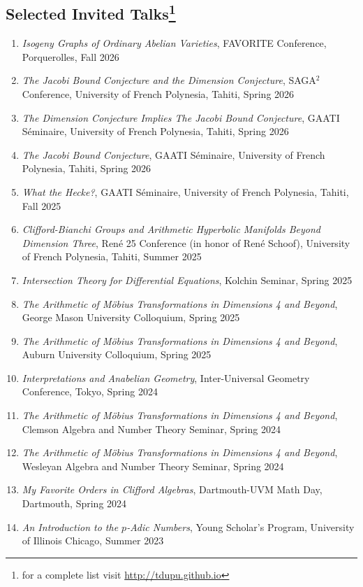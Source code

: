 \documentclass[a4paper,10pt]{article}
\begin{document}
\subsection*{Selected Invited Talks\footnote{ for a complete list visit \url{http://tdupu.github.io} }}
\begin{enumerate} %
	\item \emph{Isogeny Graphs of Ordinary Abelian Varieties}, FAVORITE Conference, Porquerolles, Fall 2026
	\item \emph{The Jacobi Bound Conjecture and the Dimension Conjecture}, SAGA$^2$ Conference, University of French Polynesia, Tahiti, Spring 2026
	\item \emph{The Dimension Conjecture Implies The Jacobi Bound Conjecture}, GAATI S\'eminaire, University of French Polynesia, Tahiti, Spring 2026
	\item \emph{The Jacobi Bound Conjecture}, GAATI S\'eminaire, University of French Polynesia, Tahiti, Spring 2026
	\item \emph{What the Hecke?}, GAATI S\'eminaire, University of French Polynesia, Tahiti, Fall 2025
	\item \emph{Clifford-Bianchi Groups and Arithmetic Hyperbolic Manifolds Beyond Dimension Three}, Ren\'e 25 Conference (in honor of Ren\'e Schoof), University of French Polynesia, Tahiti, Summer 2025
	\item \emph{Intersection Theory for Differential Equations}, Kolchin Seminar, Spring 2025
	\item \emph{The Arithmetic of M\"{o}bius Transformations in Dimensions 4 and Beyond}, George Mason University Colloquium, Spring 2025
	\item \emph{The Arithmetic of M\"{o}bius Transformations in Dimensions 4 and Beyond}, Auburn University Colloquium, Spring 2025
	\item \emph{Interpretations and Anabelian Geometry}, Inter-Universal Geometry Conference, Tokyo, Spring 2024
	\item \emph{The Arithmetic of M\"{o}bius Transformations in Dimensions 4 and Beyond}, Clemson Algebra and Number Theory Seminar, Spring 2024
	\item \emph{The Arithmetic of M\"{o}bius Transformations in Dimensions 4 and Beyond}, Wesleyan Algebra and Number Theory Seminar, Spring 2024
	\item \emph{My Favorite Orders in Clifford Algebras}, Dartmouth-UVM Math Day, Dartmouth, Spring 2024 
	\item \emph{An Introduction to the $p$-Adic Numbers}, Young Scholar’s Program, University of Illinois Chicago, Summer 2023

\end{enumerate}
\end{document}
